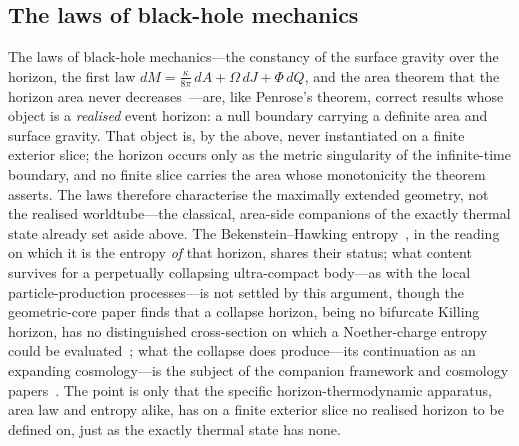 \documentclass[11pt,a4paper]{article}
\theoremstyle{plain}
\theoremstyle{remark}
\begin{document}
\subsection*{The laws of black-hole mechanics}
The laws of black-hole mechanics---the constancy of the surface gravity over the horizon, the first law $dM=\tfrac{\kappa}{8\pi}\,dA+\Omega\,dJ+\Phi\,dQ$, and the area theorem that the horizon area never decreases~\cite{Bardeen1973,hawking1971}---are, like Penrose's theorem, correct results whose object is a \emph{realised} event horizon: a null boundary carrying a definite area and surface gravity. That object is, by the above, never instantiated on a finite exterior slice; the horizon occurs only as the metric singularity of the infinite-time boundary, and no finite slice carries the area whose monotonicity the theorem asserts. The laws therefore characterise the maximally extended geometry, not the realised worldtube---the classical, area-side companions of the exactly thermal state already set aside above. The Bekenstein--Hawking entropy~\cite{Bekenstein1973}, in the reading on which it is the entropy \emph{of} that horizon, shares their status; what content survives for a perpetually collapsing ultra-compact body---as with the local particle-production processes---is not settled by this argument, though the geometric-core paper finds that a collapse horizon, being no bifurcate Killing horizon, has no distinguished cross-section on which a Noether-charge entropy could be evaluated~\cite{JanzenGeometricCore}; what the collapse does produce---its continuation as an expanding cosmology---is the subject of the companion framework and cosmology papers~\cite{JanzenCRframework,JanzenCRcosmology}. The point is only that the specific horizon-thermodynamic apparatus, area law and entropy alike, has on a finite exterior slice no realised horizon to be defined on, just as the exactly thermal state has none.
\end{document}
